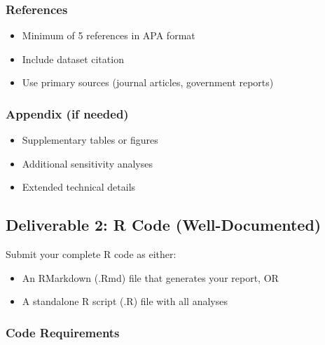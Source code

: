 \documentclass[11pt]{article}
\begin{document}
\subsubsection{References}

\begin{itemize}
\item Minimum of 5 references in APA format
\item Include dataset citation
\item Use primary sources (journal articles, government reports)
\end{itemize}

\subsubsection{Appendix (if needed)}

\begin{itemize}
\item Supplementary tables or figures
\item Additional sensitivity analyses
\item Extended technical details
\end{itemize}

\subsection{Deliverable 2: R Code (Well-Documented)}

Submit your complete R code as either:
\begin{itemize}
\item An RMarkdown (.Rmd) file that generates your report, OR
\item A standalone R script (.R) file with all analyses
\end{itemize}

\subsubsection{Code Requirements}
\end{document}
